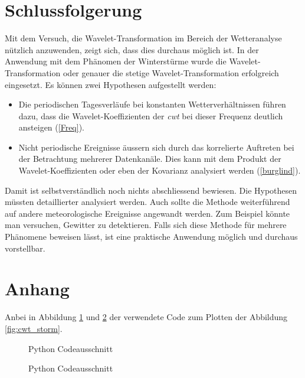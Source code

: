 \begin{refsection}
\section{Schlussfolgerung}

Mit dem Versuch, die Wavelet-Transformation im Bereich der Wetteranalyse nützlich anzuwenden, zeigt sich, dass dies durchaus möglich ist.
In der Anwendung mit dem Phänomen der Winterstürme wurde die Wavelet-Transformation oder genauer die stetige Wavelet-Transformation erfolgreich eingesetzt.
Es können zwei Hypothesen aufgestellt werden:
\begin{itemize}
	\item Die periodischen Tagesverläufe bei konstanten Wetterverhältnissen führen dazu, dass die Wavelet-Koeffizienten der \textit{cwt} bei dieser Frequenz deutlich ansteigen (\ref{Freq}).
	
	\item Nicht periodische Ereignisse äussern sich durch das korrelierte Auftreten bei der Betrachtung mehrerer Datenkanäle. Dies kann mit dem Produkt der Wavelet-Koeffizienten oder eben der Kovarianz analysiert werden (\ref{burglind}).
\end{itemize}


Damit ist selbstverständlich noch nichts abschliessend bewiesen. Die Hypothesen müssten detaillierter analysiert werden.
Auch sollte die Methode weiterführend auf andere meteorologische Ereignisse angewandt werden.
Zum Beispiel könnte man versuchen, Gewitter zu detektieren.
Falls sich diese Methode für mehrere Phänomene beweisen lässt, ist eine praktische Anwendung möglich und durchaus vorstellbar. 

\section{Anhang}
Anbei in Abbildung \ref{fig:python-plot-code} und \ref{fig:python-plot-code2} der verwendete Code zum Plotten der Abbildung \ref{fig:cwt_storm}.

\begin{figure}[h]
	\centering
	
	\caption{Python Codeausschnitt}
	\label{fig:python-plot-code}
\end{figure}
\begin{figure}[h]
	\centering
	
	\caption{Python Codeausschnitt}
	\label{fig:python-plot-code2}
\end{figure}
 
 \newpage

\printbibliography[heading=subbibliography]
\end{refsection}
